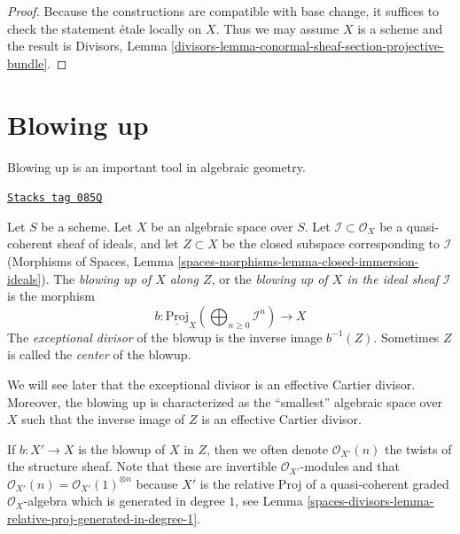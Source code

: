 \begin{proof}
Because the constructions are compatible with base change, it suffices to
check the statement \'etale locally on $X$. Thus we may assume $X$ is
a scheme and the result is
Divisors, Lemma \ref{divisors-lemma-conormal-sheaf-section-projective-bundle}.
\end{proof}

\section{Blowing up}
\label{spaces-divisors-section-blowing-up}
Blowing up is an important tool in algebraic geometry.

\begin{definition}[Blow up]
\label{spaces-divisors-definition-blow-up}
\href{https://stacks.math.columbia.edu/tag/085Q}{\texttt{Stacks tag 085Q}}

Let $S$ be a scheme. Let $X$ be an algebraic space over $S$.
Let $\mathcal{I} \subset \mathcal{O}_X$ be a quasi-coherent sheaf
of ideals, and let $Z \subset X$ be the closed subspace corresponding
to $\mathcal{I}$
(Morphisms of Spaces, Lemma
\ref{spaces-morphisms-lemma-closed-immersion-ideals}).
The {\it blowing up of $X$ along $Z$}, or the
{\it blowing up of $X$ in the ideal sheaf $\mathcal{I}$} is
the morphism
$$
b :
\underline{\text{Proj}}_X
\left(\bigoplus\nolimits_{n \geq 0} \mathcal{I}^n\right)
\longrightarrow
X
$$
The {\it exceptional divisor} of the blowup is the inverse image
$b^{-1}(Z)$. Sometimes $Z$ is called the {\it center} of the blowup.
\end{definition}

We will see later that the exceptional divisor is an effective Cartier
divisor. Moreover, the blowing up is characterized as the ``smallest''
algebraic space over $X$ such that the inverse image of $Z$ is an
effective Cartier divisor.

\medskip\noindent
If $b : X' \to X$ is the blowup of $X$ in $Z$, then we often denote
$\mathcal{O}_{X'}(n)$ the twists of the structure sheaf. Note that these
are invertible $\mathcal{O}_{X'}$-modules and that
$\mathcal{O}_{X'}(n) = \mathcal{O}_{X'}(1)^{\otimes n}$
because $X'$ is the relative Proj of a quasi-coherent graded
$\mathcal{O}_X$-algebra which is generated in degree $1$, see
Lemma \ref{spaces-divisors-lemma-relative-proj-generated-in-degree-1}.


